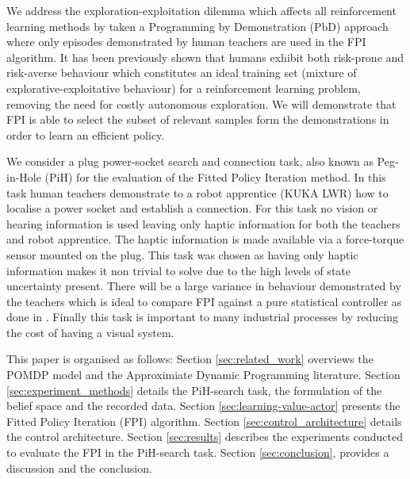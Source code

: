 \documentclass[final,5p,times,twocolumn]{elsarticle}
\begin{document}
We address the exploration-exploitation dilemma which affects all reinforcement learning methods by taken 
a Programming by Demonstration (PbD) approach where only episodes demonstrated by human teachers 
are used in the FPI algorithm. It has been previously shown \cite{Chambrier2014} 
that humans exhibit both risk-prone and risk-averse behaviour which constitutes an ideal training set 
(mixture of explorative-exploitative behaviour) for a reinforcement learning problem, removing the 
need for costly autonomous exploration. We will demonstrate that FPI is able to select the subset of 
relevant samples form the demonstrations in order to learn an efficient policy.

We consider a plug power-socket search and connection task, also known as Peg-in-Hole 
(PiH)\cite{search_strategies_icra_2001} for the evaluation of the Fitted Policy Iteration method. 
In this task human teachers demonstrate to a robot apprentice (KUKA LWR) how to localise a power
socket and establish a connection. For this task no vision or hearing information is used leaving 
only haptic information for both the teachers and robot apprentice. The haptic information is 
made available via a force-torque sensor mounted on the plug. This task was chosen as having 
only haptic information makes it non trivial to solve due to the high levels of state uncertainty present. 
There will be a large variance in behaviour demonstrated by the teachers which is 
ideal to compare FPI against a pure statistical controller as done in \cite{Chambrier2014}. 
Finally this task is important to many industrial processes by reducing the cost of having 
a visual system.



This paper is organised as follows: Section \ref{sec:related_work} overviews the POMDP model and the Approximiate Dynamic Programming 
literature. Section \ref{sec:experiment_methods} details the PiH-search task, the formulation of the belief space and the recorded data. Section \ref{sec:learning-value-actor} presents the Fitted Policy Iteration (FPI) algorithm.
Section \ref{sec:control_architecture} details the control architecture. Section \ref{sec:results} describes the experiments 
conducted to evaluate the FPI in the PiH-search task. Section \ref{sec:conclusion}, provides a discussion and the conclusion.
\end{document}
